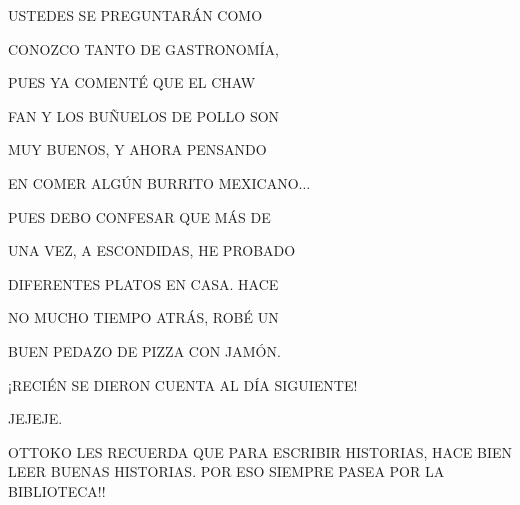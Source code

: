 \newpage
{}	
\begin{minipage}{.6\textwidth}	
	USTEDES SE PREGUNTARÁN COMO 
	
	CONOZCO TANTO DE GASTRONOMÍA,
	
	PUES YA 		
	COMENTÉ QUE EL CHAW 
	
	FAN 
	Y LOS 		
	BUÑUELOS DE POLLO
	SON 
	
	MUY 		
	BUENOS,				
	Y AHORA PENSANDO 
	
	EN COMER 
	ALGÚN 		
	BURRITO 		
	MEXICANO$\ldots$ 
	
	PUES DEBO 
	CONFESAR 	
	QUE MÁS DE
	
	UNA VEZ, 
	A ESCONDIDAS,	 
	HE PROBADO 
	
	DIFERENTES 
	PLATOS EN 		  
	CASA. 		  
	HACE 
	
	NO MUCHO TIEMPO ATRÁS, 
	ROBÉ UN 
	
	BUEN PEDAZO
	DE PIZZA CON JAMÓN. 
	
	¡RECIÉN SE DIERON CUENTA AL		   
	DÍA SIGUIENTE! 
	
	JEJEJE.
\end{minipage}



\newpage
{}

\begin{minipage}{.4\textwidth}	\vspace{.3\textheight}
	OTTOKO LES RECUERDA QUE PARA ESCRIBIR HISTORIAS, HACE BIEN LEER BUENAS HISTORIAS. POR ESO SIEMPRE PASEA POR LA BIBLIOTECA!! 
\end{minipage}

